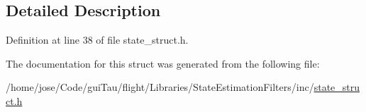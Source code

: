 \subsection{Detailed Description}


Definition at line 38 of file state\-\_\-struct.\-h.



The documentation for this struct was generated from the following file\-:\begin{DoxyCompactItemize}
\item 
/home/jose/\-Code/gui\-Tau/flight/\-Libraries/\-State\-Estimation\-Filters/inc/\hyperlink{state__struct_8h}{state\-\_\-struct.\-h}\end{DoxyCompactItemize}
